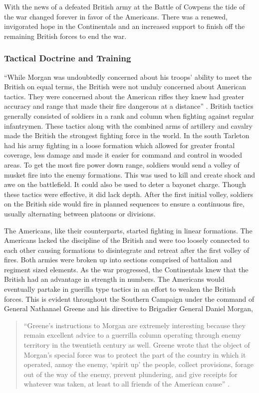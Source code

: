 With the news of a defeated British army at the Battle of Cowpens the tide of
the war changed forever in favor of the Americans. There was a renewed,
invigorated hope in the Continentals and an increased support to finish off the
remaining British forces to end the war.
\subsubsection{Tactical Doctrine and Training}

“While Morgan was undoubtedly concerned about his troops’ ability to meet the
British on equal terms, the British were not unduly concerned about American
tactics. They were concerned about the American rifles they knew had greater
accuracy and range that made their fire dangerous at a distance”
\cite[p.18]{babits_devil_2001}.
British tactics generally consisted of soldiers in a rank and column when
fighting against regular infantrymen. These tactics along with the combined arms
of artillery and cavalry made the British the strongest fighting force in the
world. In the south Tarleton had his army fighting in a loose formation which
allowed for greater frontal coverage, less damage and made it easier for command
and control in wooded areas.  To get the most fire power down range, soldiers
would send a volley of musket fire into the enemy formations.  This was used to
kill and create shock and awe on the battlefield.  It could also be used to
deter a bayonet charge. Though these tactics were effective, it did lack depth.
After the first initial volley, soldiers on the British side would fire in
planned sequences to ensure a continuous fire, usually alternating between
platoons or divisions.  

The Americans, like their counterparts, started fighting in linear formations.
The Americans lacked the discipline of the British and were too loosely
connected to each other causing formations to disintegrate and retreat after the
first volley of fires.  Both armies were broken up into sections comprised of
battalion and regiment sized elements.  As the war progressed, the Continentals
knew that the British had an advantage in strength in numbers. The Americans
would eventually partake in guerilla type tactics in an effort to weaken the
British forces.  This is evident throughout the Southern Campaign under the
command of General Nathanael Greene and his directive to Brigadier General
Daniel Morgan, 

\begin{quote}
“Greene’s instructions to Morgan are extremely interesting because they remain
excellent advice to a guerrilla column operating through enemy territory in the
twentieth century as well.  Greene wrote that the object of Morgan’s special
force was to protect the part of the country in which it operated, annoy the
enemy, ‘spirit up’ the people, collect provisions, forage out of the way of the
enemy, prevent plundering, and give receipts for whatever was taken, at least to
all friends of the American cause” \cite[p.120]{lumpkin_savannah_1981}.
\end{quote}

